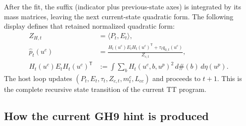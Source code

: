\documentclass[11pt]{article}
\begin{document}
After the fit, the suffix (indicator plus previous-state axes) is integrated
by its mass matrices, leaving the next current-state quadratic form.  The
following display defines that retained normalized quadratic form:
\begin{equation}
  \begin{aligned}
  Z_{H,t}&=\langle P_t,E_t\rangle,\\
  \widehat p_t(u^c)&=
  \frac{H_t(u^c)E_tH_t(u^c)^\mathsf T+\tau_tq_{0,t}(u^c)}{Z_{c,t}},\\
  H_t(u^c)E_tH_t(u^c)^\mathsf T
  &:=\int\sum_b H_t(u^c,b,u^p)^2\,d\#(b)\,d\eta(u^p).
  \end{aligned}
  \label{eq:actual-transition-retention}
\end{equation}
The host loop updates $(P_t,E_t,\tau_t,Z_{c,t},m_t^c,L_{cc})$ and proceeds to
$t+1$.  This is the complete recursive state transition of the current TT
program.

\subsection{How the current GH9 hint is produced}
\end{document}
